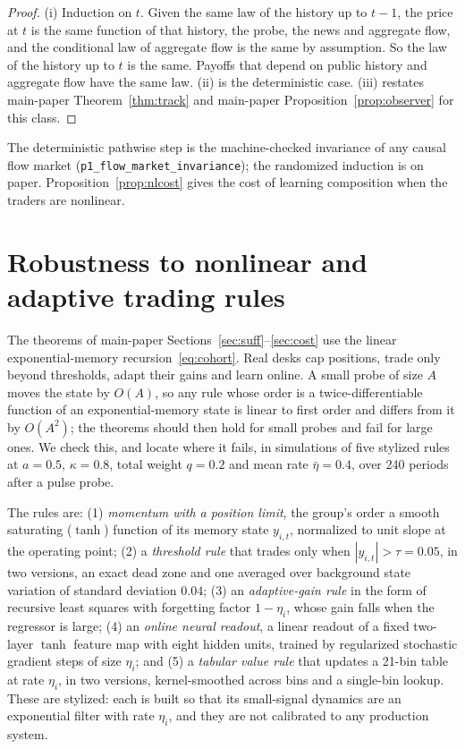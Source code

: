 \documentclass[12pt]{article}
\theoremstyle{definition}
\theoremstyle{remark}
\begin{document}
\begin{proof}
(i) Induction on $t$. Given the same law of the history up to $t-1$, the price at $t$ is the same function of that history, the probe, the news and aggregate flow, and the conditional law of aggregate flow is the same by assumption. So the law of the history up to $t$ is the same. Payoffs that depend on public history and aggregate flow have the same law. (ii) is the deterministic case. (iii) restates main-paper Theorem~\ref{thm:track} and main-paper Proposition~\ref{prop:observer} for this class.
\end{proof}

The deterministic pathwise step is the machine-checked invariance of any causal flow market (\texttt{p1\_flow\_market\_invariance}); the randomized induction is on paper. Proposition~\ref{prop:nlcost} gives the cost of learning composition when the traders are nonlinear.

\section{Robustness to nonlinear and adaptive trading rules}\label{sec:learners}

The theorems of main-paper Sections~\ref{sec:suff}--\ref{sec:cost} use the linear exponential-memory recursion~\eqref{eq:cohort}. Real desks cap positions, trade only beyond thresholds, adapt their gains and learn online. A small probe of size $A$ moves the state by $O(A)$, so any rule whose order is a twice-differentiable function of an exponential-memory state is linear to first order and differs from it by $O(A^2)$; the theorems should then hold for small probes and fail for large ones. We check this, and locate where it fails, in simulations of five stylized rules at $a=0.5$, $\kappa=0.8$, total weight $q=0.2$ and mean rate $\bar\eta=0.4$, over 240 periods after a pulse probe.

The rules are: (1) \emph{momentum with a position limit}, the group's order a smooth saturating ($\tanh$) function of its memory state $y_{i,t}$, normalized to unit slope at the operating point; (2) a \emph{threshold rule} that trades only when $|y_{i,t}|>\tau=0.05$, in two versions, an exact dead zone and one averaged over background state variation of standard deviation $0.04$; (3) an \emph{adaptive-gain rule} in the form of recursive least squares with forgetting factor $1-\eta_i$, whose gain falls when the regressor is large; (4) an \emph{online neural readout}, a linear readout of a fixed two-layer $\tanh$ feature map with eight hidden units, trained by regularized stochastic gradient steps of size $\eta_i$; and (5) a \emph{tabular value rule} that updates a 21-bin table at rate $\eta_i$, in two versions, kernel-smoothed across bins and a single-bin lookup. These are stylized: each is built so that its small-signal dynamics are an exponential filter with rate $\eta_i$, and they are not calibrated to any production system.
\end{document}
